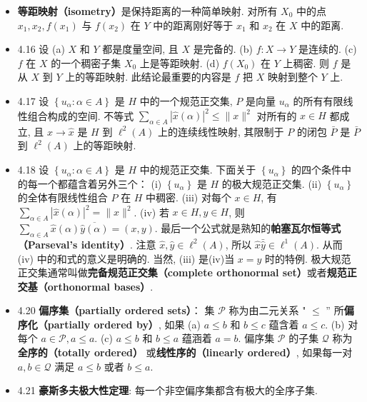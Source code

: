 \begin{itemize}
\item \textbf{等距映射（isometry）}是保持距离的一种简单映射. 对所有 $X_{0}$ 中的点 $x_{1}, x_{2}, f\left(x_{1}\right)$ 与 $f\left(x_{2}\right)$ 在 $Y$ 中的距离刚好等于 $x_{1}$ 和 $x_{2}$ 在 $X$ 中的距离.

\item 4.16 设 (a) $X$ 和 $Y$ 都是度量空间, 且 $X$ 是完备的. (b) $f: X \rightarrow Y$ 是连续的. (c) $f$ 在 $X$ 的一个稠密子集 $X_{0}$ 上是等距映射. (d) $f\left(X_{0}\right)$ 在 $Y$ 上稠密. 则 $f$ 是从 $X$ 到 $Y$ 上的等距映射. 此结论最重要的内容是 $f$ 把 $X$ 映射到整个 $Y$ 上.

\item 4.17 设 $\left\{u_{\alpha}: \alpha \in A\right\}$ 是 $H$ 中的一个规范正交集, $P$ 是向量 $u_{\alpha}$ 的所有有限线性组合构成的空间. 不等式 $\sum_{\alpha \in A}|\hat{x}(\alpha)|^{2} \leqslant\|x\|^{2}$ 对所有的 $x \in H$ 都成立, 且 $x \rightarrow \hat{x}$ 是 $H$ 到 $\ell^{2}(A)$ 上的连续线性映射, 其限制于 $P$ 的闭包 $\bar{P}$ 是 $\bar{P}$ 到 $\ell^{2}(A)$ 上的等距映射.

\item 4.18 设 $\left\{u_{\alpha}: \alpha \in A\right\}$ 是 $H$ 中的规范正交集. 下面关于 $\left\{u_{\alpha}\right\}$ 的四个条件中的每一个都蕴含着另外三个： (i) $\left\{u_{\alpha}\right\}$ 是 $H$ 的极大规范正交集. (ii) $\left\{u_{\alpha}\right\}$ 的全体有限线性组合 $P$ 在 $H$ 中稠密. (iii) 对每个 $x \in H$, 有 $\sum_{\alpha \in A}|\hat{x}(\alpha)|^{2}=\|x\|^{2}$. (iv) 若 $x \in H, y \in H$, 则 $\sum_{\alpha \in A} \hat{x}(\alpha) \overline{\hat{y}(\alpha)}=(x, y)$. 最后一个公式就是熟知的\textbf{帕塞瓦尔恒等式（Parseval's identity）}. 注意 $\hat{x},\hat{y} \in \ell^{2}(A)$, 所以 $\hat x\bar{\hat y} \in \ell^1(A)$. 从而 (iv) 中的和式的意义是明确的. 当然, (iii) 是(iv)当 $x=y$ 时的特例. 极大规范正交集通常叫做\textbf{完备规范正交集（complete orthonormal set）}或者\textbf{规范正交基（orthonormal bases）}.

\item 4.20 \textbf{偏序集（partially ordered sets）}： 集 $\mathscr{P}$ 称为由二元关系 " $\leqslant$ ” 所\textbf{偏序化（partially ordered by）}, 如果 (a) $a \leqslant b$ 和 $b \leqslant c$ 蕴含着 $a \leqslant c$. (b) 对每个 $a \in \mathscr{P}, a \leqslant a$. (c) $a \leqslant b$ 和 $b \leqslant a$ 蕴涵着 $a=b$. 偏序集 $\mathscr{P}$ 的子集 $\mathscr{Q}$ 称为\textbf{全序的（totally ordered）} 或\textbf{线性序的（linearly ordered）}, 如果每一对 $a, b \in \mathscr{Q}$ 满足 $a \leqslant b$ 或者 $b \leqslant a$.

\item 4.21 \textbf{豪斯多夫极大性定理}: 每一个非空偏序集都含有极大的全序子集.


\end{itemize}
